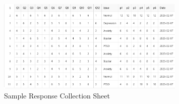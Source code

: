 \begin{figure}[h!]  
    \centering
    \includegraphics[width=0.8\textwidth]{App Images/32 Interface.png}  
    \caption*{Sample Response Collection Sheet}
    \label{01i}  %
\end{figure}


\pagebreak

